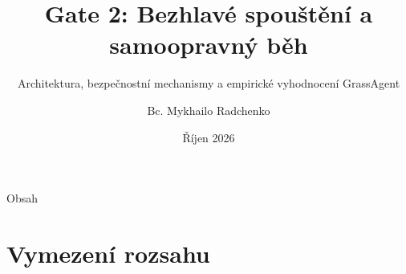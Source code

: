 \documentclass[aspectratio=169,10pt]{beamer}
\title[Gate 2]{Gate 2: Bezhlavé spouštění a samoopravný běh}
\subtitle{Architektura, bezpečnostní mechanismy a empirické vyhodnocení GrassAgent}
\author[Bc. Mykhailo Radchenko]{Bc. Mykhailo Radchenko}
\institute[GrassAgent]{Projekt GrassAgent}
\date{Říjen 2026}
\begin{document}
\begin{frame}[plain]
  \titlepage
\end{frame}

\begin{frame}{Obsah}
  \tableofcontents
\end{frame}

\section{Vymezení rozsahu}
\end{document}
